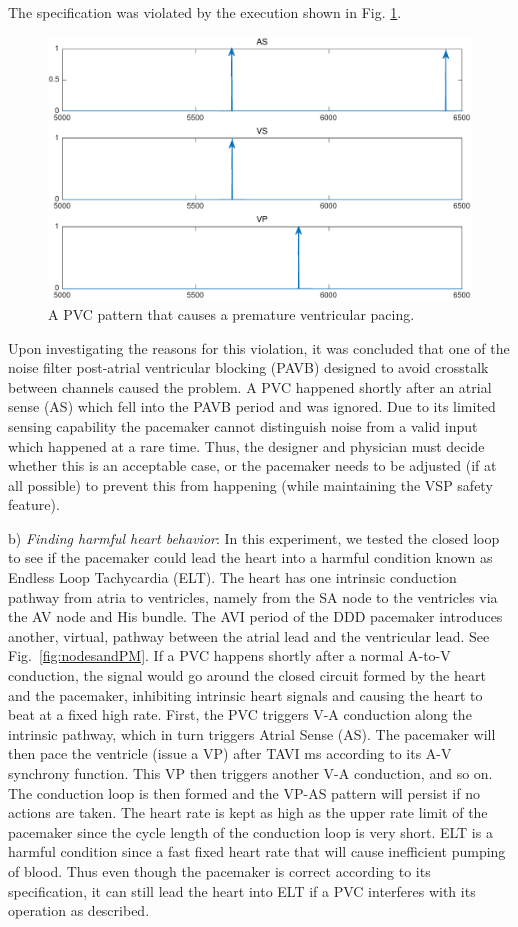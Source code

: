 The specification was violated by the execution shown in Fig. \ref{fig:bug8_kept1}.
\begin{figure}[tb]
\centering
\includegraphics[width=0.7\linewidth]{figures/bug8_kept1}
\caption{A PVC pattern that causes a premature ventricular pacing.}
\label{fig:bug8_kept1}
\end{figure}
Upon investigating the reasons for this violation, it was concluded that one of the noise filter post-atrial ventricular blocking (PAVB) designed to avoid crosstalk between channels caused the problem.  
A PVC happened shortly after an atrial sense (AS) which fell into the PAVB period and was ignored. 
Due to its limited sensing capability the pacemaker cannot distinguish noise from a valid input which happened at a rare time.
Thus, the designer and physician must decide whether this is an acceptable case, or the pacemaker needs to be adjusted (if at all possible) to prevent this from happening (while maintaining the VSP safety feature).

b) \emph{Finding harmful heart behavior}: In this experiment, we tested the closed loop to see if the pacemaker could lead the heart into a harmful condition known as Endless Loop Tachycardia (ELT).
%
The heart has one intrinsic conduction pathway from atria to ventricles, namely from the SA node to the ventricles via the AV node and His bundle.
The AVI period of the DDD pacemaker introduces another, virtual, pathway between the atrial lead and the ventricular lead.
See Fig.~\ref{fig:nodesandPM}.
If a PVC happens shortly after a normal A-to-V conduction, the signal would go around the closed circuit formed by the heart and the pacemaker, inhibiting intrinsic heart signals and causing the heart to beat at a fixed high rate.
First, the PVC triggers V-A conduction along the intrinsic pathway, 
which in turn triggers Atrial Sense (AS). 
The pacemaker will then pace the ventricle (issue a VP) after TAVI ms according to its A-V synchrony function. 
This VP then triggers another V-A conduction, and so on.
The conduction loop is then formed and the VP-AS pattern will persist if no actions are taken.
The heart rate is kept as high as the upper rate limit of the pacemaker since the cycle length of the conduction loop is very short. 
ELT is a harmful condition since a fast fixed heart rate that will cause inefficient pumping of blood.
Thus even though the pacemaker is correct according to its specification, it can still lead the heart into ELT if a PVC interferes with its operation as described.
%

